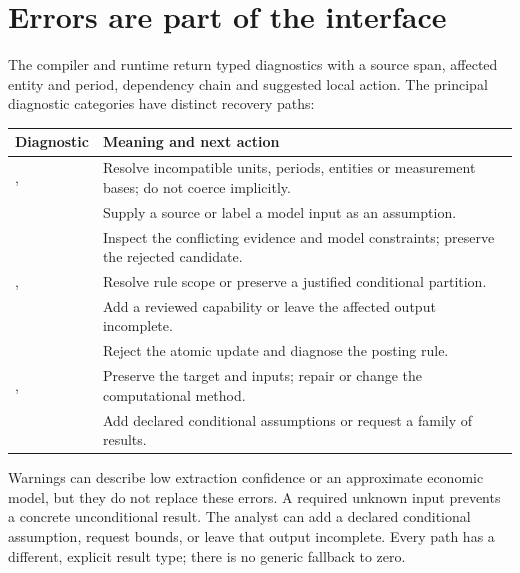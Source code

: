 \begin{minipage}{\linewidth}
\section{Errors are part of the interface}

The compiler and runtime return typed diagnostics with a source span,
affected entity and period, dependency chain and suggested local action.
The principal diagnostic categories have distinct recovery paths:

\begin{center}
\begin{tabular}{L{61mm}L{75mm}}
\toprule Diagnostic & Meaning and next action\\\midrule
{},  & Resolve incompatible units,
periods, entities or measurement bases; do not coerce implicitly.\\
 & Supply a source or label a model input as an assumption.\\
 & Inspect the conflicting evidence and model
constraints; preserve the rejected candidate.\\
,  & Resolve rule scope or
preserve a justified conditional partition.\\
 & Add a reviewed capability or leave the affected
output incomplete.\\
 & Reject the atomic update and diagnose the posting rule.\\
,  & Preserve the target and
inputs; repair or change the computational method.\\
 & Add declared conditional assumptions or
request a family of results.\\\bottomrule
\end{tabular}
\end{center}

Warnings can describe low extraction confidence or an approximate economic
model, but they do not replace these errors. A required unknown input prevents
a concrete unconditional result. The analyst can add a declared conditional
assumption, request bounds, or leave that output incomplete. Every path has a
different, explicit result type; there is no generic fallback to zero.
\end{minipage}\par
